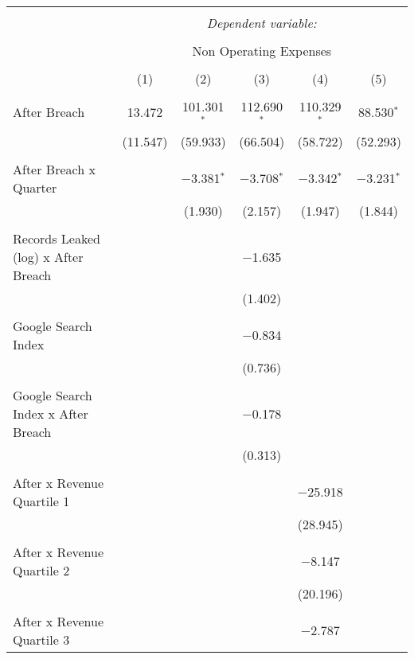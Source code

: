 
\begin{table}[!htbp] \centering 
  \caption{} 
  \label{} 
\begin{tabular}{@{\extracolsep{5pt}}lccccc} 
\\[-1.8ex]\hline 
\hline \\[-1.8ex] 
 & \multicolumn{5}{c}{\textit{Dependent variable:}} \\ 
\cline{2-6} 
\\[-1.8ex] & \multicolumn{5}{c}{Non Operating Expenses} \\ 
\\[-1.8ex] & (1) & (2) & (3) & (4) & (5)\\ 
\hline \\[-1.8ex] 
 After Breach & 13.472 & 101.301$^{*}$ & 112.690$^{*}$ & 110.329$^{*}$ & 88.530$^{*}$ \\ 
  & (11.547) & (59.933) & (66.504) & (58.722) & (52.293) \\ 
  & & & & & \\ 
 After Breach x Quarter &  & $-$3.381$^{*}$ & $-$3.708$^{*}$ & $-$3.342$^{*}$ & $-$3.231$^{*}$ \\ 
  &  & (1.930) & (2.157) & (1.947) & (1.844) \\ 
  & & & & & \\ 
 Records Leaked (log) x After Breach &  &  & $-$1.635 &  &  \\ 
  &  &  & (1.402) &  &  \\ 
  & & & & & \\ 
 Google Search Index &  &  & $-$0.834 &  &  \\ 
  &  &  & (0.736) &  &  \\ 
  & & & & & \\ 
 Google Search Index x After Breach &  &  & $-$0.178 &  &  \\ 
  &  &  & (0.313) &  &  \\ 
  & & & & & \\ 
 After x Revenue Quartile 1 &  &  &  & $-$25.918 &  \\ 
  &  &  &  & (28.945) &  \\ 
  & & & & & \\ 
 After x Revenue Quartile 2 &  &  &  & $-$8.147 &  \\ 
  &  &  &  & (20.196) &  \\ 
  & & & & & \\ 
 After x Revenue Quartile 3 &  &  &  & $-$2.787 &  \\ 

\end{tabular}
\end{table}
